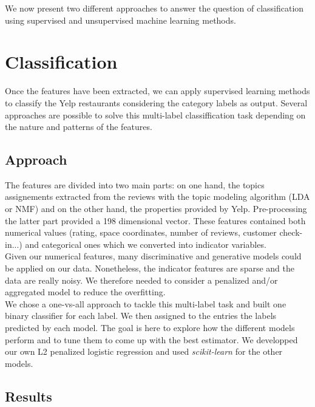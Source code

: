 \documentclass[twoside]{article}
\begin{document}
\begin{multicols}{2}
We now present two different approaches to answer the question of classification using supervised and unsupervised machine learning methods.\\

\section{Classification}

Once the features have been extracted, we can apply supervised learning methods to classify the Yelp restaurants considering the category labels as output. Several approaches are possible to solve this multi-label classiffication task depending on the nature and patterns of the features.

\subsection{Approach}

\noindent The features are divided into two main parts: on one hand, the topics assignements extracted from the reviews with the topic modeling algorithm (LDA or NMF) and on the other hand, the properties provided by Yelp. Pre-processing the latter part provided a 198 dimensional vector. These features contained both numerical values (rating, space coordinates, number of reviews, customer check-in...) and categorical ones which we converted into indicator variables.\\

\noindent Given our numerical features, many discriminative and generative models could be applied on our data. Nonetheless, the indicator features are sparse and the data are really noisy. We therefore needed to consider a penalized and/or aggregated model to reduce the overfitting.\\

\noindent We chose a one-vs-all approach to tackle this multi-label task and built one binary classifier for each label. We then assigned to the entries the labels predicted by each model. The goal is here to explore how the different models perform and to tune them to come up with the best estimator. We developped our own L2 penalized logistic regression and used \emph{scikit-learn} \cite{sklearn} for the other models.

\subsection{Results}


\end{multicols}
\end{document}
